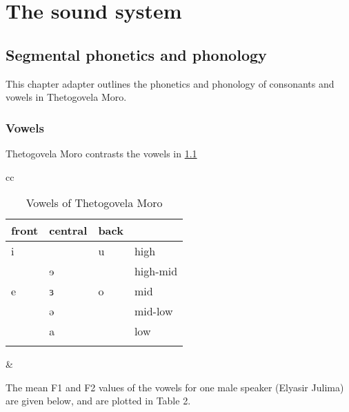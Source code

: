 \part{The sound system}

\chapter{Segmental phonetics and phonology}

This chapter adapter outlines the phonetics and phonology of consonants and vowels in Thetogovela Moro. 

\section{Vowels}

Thetogovela Moro contrasts the vowels in \ref{tab:ch2:1}

\begin{table}
\begin{tabular}{cc}
	\begin{minipage}{.5\linewidth}
	\centering
  \begin{tabular}{llll}
    \lsptoprule
    front  & central  & back & \\
    \midrule
	i 	& 		& 	u 	& 	high \\
		& 	ɘ	& 		& 	high-mid\\
	e 	&	ɜ	&  	o	& 	mid \\
		&  	ə	& 		&	mid-low \\
		& 	a	&		&	low \\
\lspbottomrule
  \end{tabular}
  \caption{Vowels of Thetogovela Moro}
  \label{tab:ch2:1}
  \end{minipage} &
  \begin{minipage}{.5\linewidth}
  \centering
	\begin{vowel}
		\putvowel{\textreve}{49pt}{15pt}
		\putvowel{\textrevepsilon}{50pt}{30pt}
	\end{vowel}
  \end{minipage}
\end{tabular}
\end{table}

The mean F1 and F2 values of the vowels for one male speaker (Elyasir Julima) are given below, and are plotted in Table 2. 

